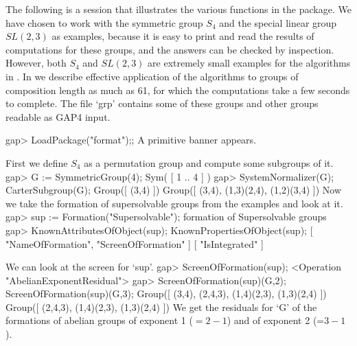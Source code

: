 



The following is a {\GAP} session that illustrates the various functions
in the package.  We have chosen to work with the symmetric group $S_4$
and the special linear group $SL(2,3)$ as examples, because it is easy
to print and read the results of computations for these groups, and the
answers can be checked by inspection. However, both
$S_4$ and $SL(2,3)$ are extremely small examples for the algorithms in
\FORMAT. In
\cite{EW} we describe effective application of the algorithms  to groups
of  composition length as much as 61, for which the computations take
a few seconds to complete. The file `grp' contains some of these groups and other groups readable as GAP4 input.

\beginexample
gap> LoadPackage("format");;
\endexample
A primitive banner appears.

First we define $S_4$ as a permutation group and compute some 
subgroups of it.
\beginexample
gap> G := SymmetricGroup(4);
Sym( [ 1 .. 4 ] )
gap> SystemNormalizer(G);  CarterSubgroup(G);
Group([ (3,4) ])
Group([ (3,4), (1,3)(2,4), (1,2)(3,4) ])
\endexample
Now we take the formation of supersolvable groups from the examples
and look at it.
\beginexample
gap> sup := Formation("Supersolvable");
formation of Supersolvable groups 
gap> KnownAttributesOfObject(sup); KnownPropertiesOfObject(sup);
[ "NameOfFormation", "ScreenOfFormation" ]
[ "IsIntegrated" ]
\endexample 

We can look at the screen for `sup'.
\beginexample
gap> ScreenOfFormation(sup);
<Operation "AbelianExponentResidual">
gap> ScreenOfFormation(sup)(G,2); ScreenOfFormation(sup)(G,3);
Group([ (3,4), (2,4,3), (1,4)(2,3), (1,3)(2,4) ])
Group([ (2,4,3), (1,4)(2,3), (1,3)(2,4) ])
\endexample
We get the residuals for `G' of the formations of abelian groups of exponent 1 ($= 2-1$) and of exponent 2 (=$3-1$).

